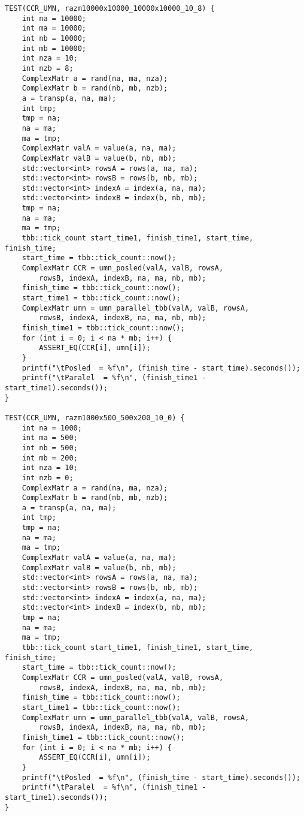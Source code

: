 \documentclass{report}
\begin{document}
\begin{lstlisting}
TEST(CCR_UMN, razm10000x10000_10000x10000_10_8) {
    int na = 10000;
    int ma = 10000;
    int nb = 10000;
    int mb = 10000;
    int nza = 10;
    int nzb = 8;
    ComplexMatr a = rand(na, ma, nza);
    ComplexMatr b = rand(nb, mb, nzb);
    a = transp(a, na, ma);
    int tmp;
    tmp = na;
    na = ma;
    ma = tmp;
    ComplexMatr valA = value(a, na, ma);
    ComplexMatr valB = value(b, nb, mb);
    std::vector<int> rowsA = rows(a, na, ma);
    std::vector<int> rowsB = rows(b, nb, mb);
    std::vector<int> indexA = index(a, na, ma);
    std::vector<int> indexB = index(b, nb, mb);
    tmp = na;
    na = ma;
    ma = tmp;
    tbb::tick_count start_time1, finish_time1, start_time, finish_time;
    start_time = tbb::tick_count::now();
    ComplexMatr CCR = umn_posled(valA, valB, rowsA,
        rowsB, indexA, indexB, na, ma, nb, mb);
    finish_time = tbb::tick_count::now();
    start_time1 = tbb::tick_count::now();
    ComplexMatr umn = umn_parallel_tbb(valA, valB, rowsA,
        rowsB, indexA, indexB, na, ma, nb, mb);
    finish_time1 = tbb::tick_count::now();
    for (int i = 0; i < na * mb; i++) {
        ASSERT_EQ(CCR[i], umn[i]);
    }
    printf("\tPosled  = %f\n", (finish_time - start_time).seconds());
    printf("\tParalel  = %f\n", (finish_time1 - start_time1).seconds());
}

TEST(CCR_UMN, razm1000x500_500x200_10_0) {
    int na = 1000;
    int ma = 500;
    int nb = 500;
    int mb = 200;
    int nza = 10;
    int nzb = 0;
    ComplexMatr a = rand(na, ma, nza);
    ComplexMatr b = rand(nb, mb, nzb);
    a = transp(a, na, ma);
    int tmp;
    tmp = na;
    na = ma;
    ma = tmp;
    ComplexMatr valA = value(a, na, ma);
    ComplexMatr valB = value(b, nb, mb);
    std::vector<int> rowsA = rows(a, na, ma);
    std::vector<int> rowsB = rows(b, nb, mb);
    std::vector<int> indexA = index(a, na, ma);
    std::vector<int> indexB = index(b, nb, mb);
    tmp = na;
    na = ma;
    ma = tmp;
    tbb::tick_count start_time1, finish_time1, start_time, finish_time;
    start_time = tbb::tick_count::now();
    ComplexMatr CCR = umn_posled(valA, valB, rowsA,
        rowsB, indexA, indexB, na, ma, nb, mb);
    finish_time = tbb::tick_count::now();
    start_time1 = tbb::tick_count::now();
    ComplexMatr umn = umn_parallel_tbb(valA, valB, rowsA,
        rowsB, indexA, indexB, na, ma, nb, mb);
    finish_time1 = tbb::tick_count::now();
    for (int i = 0; i < na * mb; i++) {
        ASSERT_EQ(CCR[i], umn[i]);
    }
    printf("\tPosled  = %f\n", (finish_time - start_time).seconds());
    printf("\tParalel  = %f\n", (finish_time1 - start_time1).seconds());
}


\end{lstlisting}
\end{document}
